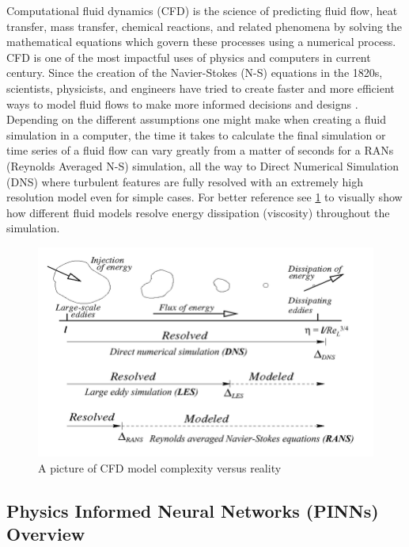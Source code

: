 \documentclass{article}
\begin{document}
	Computational fluid dynamics (CFD) is the science of predicting fluid flow, heat transfer, mass transfer, chemical reactions, and
	related phenomena by solving the mathematical equations which govern these processes using a numerical process.\cite{Bakker}
	CFD is one of the most impactful uses of physics and computers in current century. Since the creation of the Navier-Stokes (N-S) equations in the 1820s, scientists, physicists, and engineers have tried to create faster and more efficient ways to model fluid flows to make more informed decisions and designs \cite{Bakker}. Depending on the different assumptions one might make when creating a fluid simulation in a computer, the time it takes to calculate the final simulation or time series of a fluid flow can vary greatly from a matter of seconds for a RANs (Reynolds Averaged N-S) simulation, all the way to Direct Numerical Simulation (DNS) where turbulent features are fully resolved with an extremely high resolution model even for simple cases. For better reference see \ref{fig:complex} to visually show how different fluid models resolve energy dissipation (viscosity) throughout the simulation.
	

	\begin{figure}[ht!]
		\centering
		\includegraphics[scale=0.4]{./images/complex.png}
		\caption{A picture of CFD model complexity versus reality}
		\label{fig:complex}
	\end{figure}
	
	\pagebreak
	\subsection{Physics Informed Neural Networks (PINNs) Overview} \label{PINN}		
	
\end{document}
